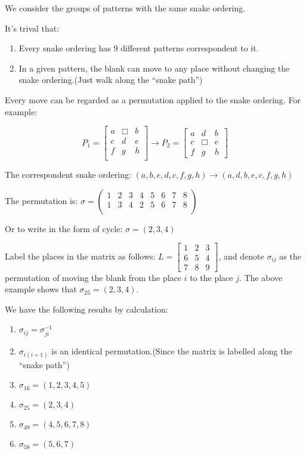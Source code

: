 We consider the groups of patterns with the same snake ordering.

It's trival that:
\begin{enumerate}
    \item Every snake ordering has 9 different patterns correspondent to it.
    \item In a given pattern, the blank can move to any place without changing the snake ordering.(Just walk along the ``snake path'')
\end{enumerate}

Every move can be regarded as a permutation applied to the snake ordering. For example:

\[ P_1 = \begin{bmatrix}a &\Box&b\\c&d&e\\f&g&h\\\end{bmatrix}  \rightarrow P_2 = \begin{bmatrix}a&d&b\\c&\Box&e\\f&g&h\end{bmatrix}\]

The correspondent snake ordering: $ (a,b,e,d,c,f,g,h)\rightarrow (a,d,b,e,c,f,g,h)$

The permutation is: $ \sigma = \begin{pmatrix}1&2&3&4&5&6&7&8\\1&3&4&2&5&6&7&8\\\end{pmatrix}$

Or to write in the form of cycle: $ \sigma = (2,3,4)$
\vspace{3em}

Label the places in the matrix as follows: $ L = \begin{bmatrix}1&2&3\\6&5&4\\7&8&9\end{bmatrix}$, and denote $ \sigma_{ij}$ as the
permutation of moving the blank from the place $ i$ to the place $ j$. The above example shows that $ \sigma_{25} = (2,3,4)$.

We have the following results by calculation:
\begin{enumerate}
    \item $ \sigma_{ij}= \sigma_{ji}^{-1}$
      \item $ \sigma_{i(i+1)}$ is an identical permutation.(Since the matrix is labelled along the ``snake path'')
          \item$  \sigma_{16} = (1,2,3,4,5)$
          \item$  \sigma_{25} = (2,3,4)$
          \item$  \sigma_{49} = (4,5,6,7,8)$
          \item$  \sigma_{58} = (5,6,7)$
\end{enumerate}

